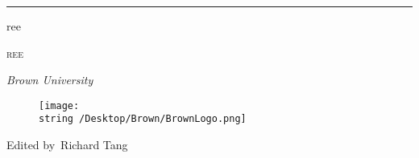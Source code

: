 \documentclass{math-notes-v1/notes}
\begin{document}
\begin{titlepage}
\vspace{0.75\baselineskip} %

\rule{\textwidth}{0.4pt}\vspace*{-\baselineskip}\vspace{3.2pt} %

\vspace{2\baselineskip} %


\LARGE{ree} 

\vspace*{3\baselineskip} %



\vspace{0.5\baselineskip} 

{\scshape   \LARGE ree\\ }

\vspace{0.2\baselineskip} 

\textit{\Large Brown University} 

\vfill 


\begin{figure}[!h]
    \centering
    \texttt{[image: \\string~/Desktop/Brown/BrownLogo.png]}
\end{figure}
\vspace{0.3\baselineskip} 


{\large Edited by\  Richard Tang}
\end{titlepage}

\newpage

\tableofcontents

\newpage






\pagebreak

\medskip

\end{document}
